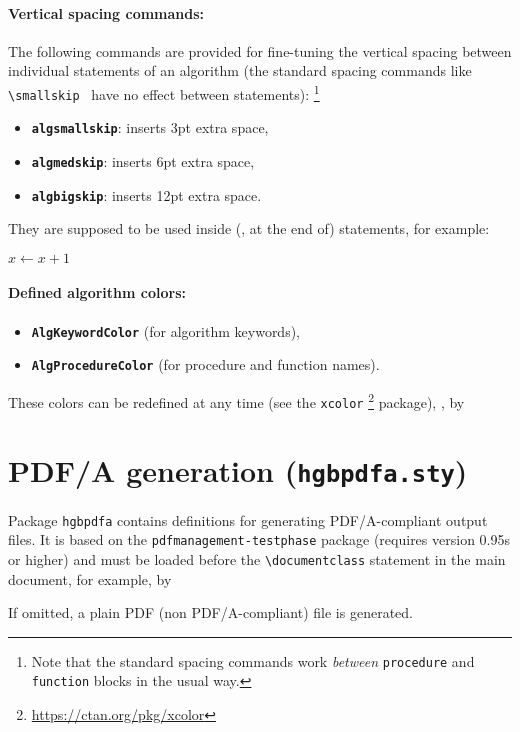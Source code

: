 \documentclass[english]{hgbarticle}
\begin{document}
\paragraph{Vertical spacing commands:}
The following commands are provided for fine-tuning the vertical spacing
between individual statements of an algorithm (the standard spacing commands
like \verb!\smallskip! \etc\ have no effect between statements):%
\footnote{Note that the standard spacing commands work \emph{between}
\texttt{procedure} and \texttt{function} blocks in the usual way.}
\begin{itemize}
    \item \textbf{{\bs}\texttt{algsmallskip}}: inserts 3pt extra space,
    \item \textbf{{\bs}\texttt{algmedskip}}: inserts 6pt extra space,
    \item \textbf{{\bs}\texttt{algbigskip}}: inserts 12pt extra space.
\end{itemize}
They are supposed to be used inside (\ie, at the end of) statements, for
example:
%
\begin{LaTeXCode}[numbers=none]
    \State $x \gets x + 1$ \algsmallskip
\end{LaTeXCode}

\paragraph{Defined algorithm colors:}
\begin{itemize}
    \item \textbf{\texttt{AlgKeywordColor}} (for algorithm keywords),
    \item \textbf{\texttt{AlgProcedureColor}} (for procedure and function
    names).
\end{itemize}
These colors can be redefined at any time (see the \texttt{xcolor}%
\footnote{\url{https://ctan.org/pkg/xcolor}}
package), \eg, by
\begin{LaTeXCode}[numbers=none]
\end{LaTeXCode}


\section{PDF/A generation (\texttt{hgbpdfa.sty})}

Package \texttt{hgbpdfa} contains definitions for generating PDF/A-compliant 
output files. It is based on the \texttt{pdfmanagement-testphase} package
(requires version 0.95s or higher) and must be loaded before the
\verb!\documentclass! statement in the main document, for example, by
\begin{LaTeXCode}[numbers=none]
\RequirePackage{hgbpdfa}
\end{LaTeXCode}
If omitted, a plain PDF (non PDF/A-compliant) file is generated.
\end{document}
